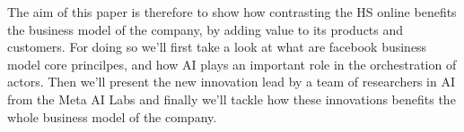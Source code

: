 
The aim of this paper is therefore to show how contrasting the HS
online benefits the business model of the company, by adding value to
its products and customers. For doing so we'll first take a look at
what are facebook business model core princilpes, and how AI plays an
important role in the orchestration of actors. Then we'll present the
new innovation lead by a team of researchers in AI from the Meta AI
Labs and finally we'll tackle how these innovations benefits the whole
business model of the company.
